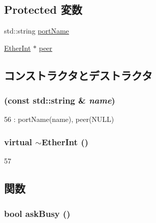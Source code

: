 \subsection*{Protected 変数}
\begin{DoxyCompactItemize}
\item 
std::string \hyperlink{classEtherInt_a3ba70989fe75b76393da3cbc6bdcf196}{portName}
\item 
\hyperlink{classEtherInt}{EtherInt} $\ast$ \hyperlink{classEtherInt_a9360307b9d65714e054bd693e249cf51}{peer}
\end{DoxyCompactItemize}


\subsection{コンストラクタとデストラクタ}
\hypertarget{classEtherInt_a076ba043f9bbbbfde81da2f53aa4c66f}{
\subsubsection[{EtherInt}]{ (const std::string \& {\em name})}}
\label{classEtherInt_a076ba043f9bbbbfde81da2f53aa4c66f}



\begin{DoxyCode}
56         : portName(name), peer(NULL) {}
\end{DoxyCode}
\hypertarget{classEtherInt_adeeb124d90321b0ab9d68d7832758b58}{
\subsubsection[{$\sim$EtherInt}]{\setlength{\rightskip}{0pt plus 5cm}virtual $\sim${\bf EtherInt} ()}}
\label{classEtherInt_adeeb124d90321b0ab9d68d7832758b58}



\begin{DoxyCode}
57 {}
\end{DoxyCode}


\subsection{関数}
\hypertarget{classEtherInt_a85518aa8ebcb27030b04db3ae6cd8929}{
\subsubsection[{askBusy}]{\setlength{\rightskip}{0pt plus 5cm}bool askBusy ()}}
\label{classEtherInt_a85518aa8ebcb27030b04db3ae6cd8929}



